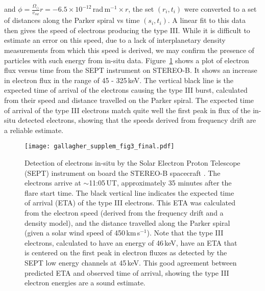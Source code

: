 and $\phi=\frac{ \Omega_{\odot}}{v_{sw}}r=-6.5\times10^{-12}$\,rad\,m$^{-1}\times r$, the set $(r_i,t_i)$ were converted to a set of distances along the Parker spiral vs time $(s_i, t_i)$. A linear fit to this data then gives the speed of electrons producing the type III. While it is difficult to estimate an error on this speed, due to a lack of interplanetary density measurements from which this speed is derived, we may confirm the presence of particles with such energy from in-situ data. Figure~\ref{fig:sept} shows a plot of electron flux versus time from the SEPT instrument on STEREO-B. It shows an increase in electron flux in the range of 45 - 325\,keV. The vertical black line is the expected time of arrival of the electrons causing the type III burst, calculated from their speed and distance travelled on the Parker spiral. The expected time of arrival of the type III electrons match quite well the first peak in flux of the in-situ detected electrons, showing that the speeds derived from frequency drift are a reliable estimate.
\begin{figure}[!t]
\begin{center}
\texttt{[image: gallagher\_supplem\_fig3\_final.pdf]}
\caption[SEPT in-situ detection of electrons]{Detection of electrons in-situ by the Solar Electron Proton Telescope (SEPT)\citep{muller2008} instrument on board the STEREO-B spacecraft \citep{kai08}. The electrons arrive at $\sim$11:05\,UT, approximately 35 minutes after the flare start time. The black vertical line indicates the expected time of arrival (ETA) of the type III electrons. This ETA was calculated from the electron speed (derived from the frequency drift and a density model), and the distance travelled along the Parker spiral (given a solar wind speed of 450\,km\,s$^{-1}$). Note that the type III electrons, calculated to have an energy of 46\,keV, have an ETA that is centered on the first peak in electron fluxes as detected by the SEPT low energy channels at 45\,keV. This good agreement between predicted ETA and observed time of arrival, showing the type III electron energies are a sound estimate.}
\label{fig:sept}
\end{center}
\end{figure}

